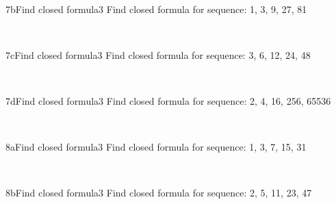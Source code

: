 \documentclass[a4paper,12pt]{book}
\begin{document}
    ~\\
    \begin{answersheetquestion}{7b}{Find closed formula}{3}
        Find closed formula for sequence: 1, 3, 9, 27, 81
        \iftoggle{answerkey}{ \begin{answer} $a_{n} = 3 \cdot a_{n-1}$ \end{answer} }{ { ~\\ \raisebox{0pt}[2cm][0pt]{  } } }
    \end{answersheetquestion}

    ~\\
    \begin{answersheetquestion}{7c}{Find closed formula}{3}
        Find closed formula for sequence: 3, 6, 12, 24, 48
        \iftoggle{answerkey}{ \begin{answer} $a_{n} = 2 \cdot a_{n-1}$ \end{answer} }{ { ~\\ \raisebox{0pt}[2cm][0pt]{  } } }
    \end{answersheetquestion}

    ~\\
    \begin{answersheetquestion}{7d}{Find closed formula}{3}
        Find closed formula for sequence: 2, 4, 16, 256, 65536
        \iftoggle{answerkey}{ \begin{answer} $a_{n} = (a_{n-1})^{2}$ \end{answer} }{ { ~\\ \raisebox{0pt}[2cm][0pt]{  } } }
    \end{answersheetquestion}

    \hrulefill

    ~\\
    \begin{answersheetquestion}{8a}{Find closed formula}{3}
        Find closed formula for sequence: 1, 3, 7, 15, 31
        \iftoggle{answerkey}{ \begin{answer} $a_{n} = 2 \cdot a_{n-1} + 1$ \end{answer} }{ { ~\\ \raisebox{0pt}[2cm][0pt]{  } } }
    \end{answersheetquestion}

    ~\\
    \begin{answersheetquestion}{8b}{Find closed formula}{3}
        Find closed formula for sequence: 2, 5, 11, 23, 47
        \iftoggle{answerkey}{ \begin{answer} $a_{n} = 2 \cdot a_{n-1} + 1$ \end{answer} }{ { ~\\ \raisebox{0pt}[2cm][0pt]{  } } }
    \end{answersheetquestion}
\end{document}
